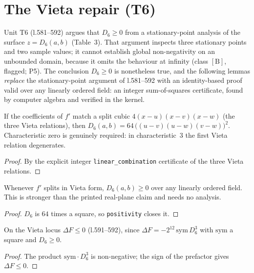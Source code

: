 \section{The Vieta repair (T6)}

Unit $\mathrm{T6}$ (l.581--592) argues that $D_{6}\geq 0$ from a stationary-point
analysis of the surface $z=D_{6}(a,b)$ (Table~3).  That argument inspects three
stationary points and two sample values; it cannot establish global non-negativity on
an unbounded domain, because it omits the behaviour at infinity (class $[\mathrm{B}]$,
flagged; P5).  The conclusion $D_{6}\geq 0$ is nonetheless true, and the following
lemmas \emph{replace} the stationary-point argument of l.581--592 with an
identity-based proof valid over any linearly ordered field: an integer sum-of-squares
certificate, found by computer algebra and verified in the kernel.

\begin{theorem}\label{D6_eq_sq_of_vieta}\leanok
{}
If the coefficients of $f'$ match a split cubic $4(x-u)(x-v)(x-w)$ (the three Vieta
relations), then $D_{6}(a,b)=64\,\bigl((u-v)(u-w)(v-w)\bigr)^{2}$.  Characteristic zero
is genuinely required: in characteristic~$3$ the first Vieta relation degenerates.
\end{theorem}
\begin{proof}\leanok
By the explicit integer \texttt{linear\_combination} certificate of the three Vieta
relations.
\end{proof}

\begin{theorem}\label{D6_nonneg_of_vieta}\leanok
{}
Whenever $f'$ splits in Vieta form, $D_{6}(a,b)\geq 0$ over any linearly ordered field.
This is stronger than the printed real-plane claim and needs no analysis.
\end{theorem}
\begin{proof}\leanok
{}
$D_{6}$ is $64$ times a square, so \texttt{positivity} closes it.
\end{proof}

\begin{theorem}\label{deltaF_nonpos_of_vieta}\leanok
{}
On the Vieta locus $\Delta F\leq 0$ (l.591--592), since
$\Delta F=-2^{12}\,\mathrm{sym}\,D_{6}^{3}$ with $\mathrm{sym}$ a square and
$D_{6}\geq 0$.
\end{theorem}
\begin{proof}\leanok
{}
The product $\mathrm{sym}\cdot D_{6}^{3}$ is non-negative; the sign of the prefactor
gives $\Delta F\leq 0$.
\end{proof}

